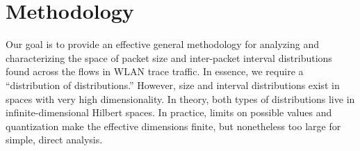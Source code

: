\documentclass[conference]{IEEEtran}
\newcommand{\caps}[1]{{\small{#1}}}
\begin{document}


\section{Methodology}
\label{sec:methodology}

Our goal is to provide an effective general methodology for analyzing and characterizing the space of packet size and inter-packet interval distributions found across the flows in \caps{WLAN} trace traffic. In essence, we require a ``distribution of distributions.'' %
However, size and interval distributions exist in spaces with very high dimensionality. In theory, both types of distributions live in infinite-dimensional Hilbert spaces. %
In practice, limits on possible values and quantization make the effective dimensions finite, but nonetheless too large for simple, direct analysis.%
\end{document}
